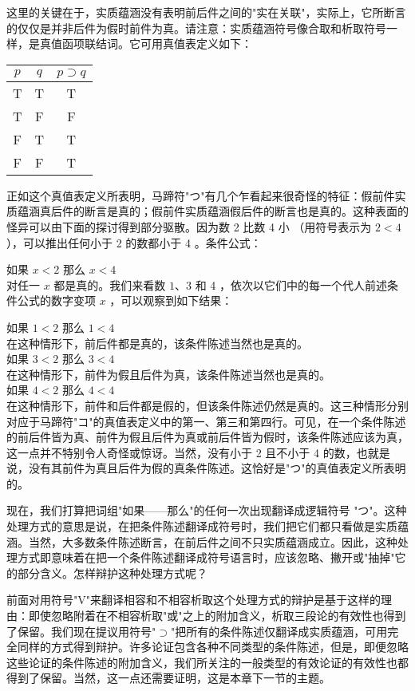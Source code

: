 这里的关键在于，实质蕴涵没有表明前后件之间的"实在关联"，实际上，它所断言的仅仅是并非后件为假时前件为真。请注意：实质蕴涵符号像合取和析取符号一样，是真值函项联结词。它可用真值表定义如下：

\begin{center}
\begin{tabular}{|ccc|}
\hline
$p$ & $q$ & $p \supset q$ \\
\hline
T & T & T \\
T & F & F \\
F & T & T \\
F & F & T \\
\hline
\end{tabular}
\end{center}

正如这个真值表定义所表明，马蹄符"つ"有几个乍看起来很奇怪的特征：假前件实质蕴涵真后件的断言是真的；假前件实质蕴涵假后件的断言也是真的。这种表面的怪异可以由下面的探讨得到部分驱散。因为数 2 比数 4 小 （用符号表示为 $2<4$ ），可以推出任何小于 2 的数都小于 4 。条件公式：

如果 $x<2$ 那么 $x<4$\\
对任一 $x$ 都是真的。我们来看数 $1 、 3$ 和 4 ，依次以它们中的每一个代人前述条件公式的数字变项 $x$ ，可以观察到如下结果：

如果 $1<2$ 那么 $1<4$\\
在这种情形下，前后件都是真的，该条件陈述当然也是真的。\\
如果 $3<2$ 那么 $3<4$\\
在这种情形下，前件为假且后件为真，该条件陈述当然也是真的。\\
如果 $4<2$ 那么 $4<4$\\
在这种情形下，前件和后件都是假的，但该条件陈述仍然是真的。这三种情形分别对应于马蹄符"コ"的真值表定义中的第一、第三和第四行。可见，在一个条件陈述的前后件皆为真、前件为假且后件为真或前后件皆为假时，该条件陈述应该为真，这一点并不特别令人奇怪或惊讶。当然，没有小于 2 且不小于 4 的数，也就是说，没有其前件为真且后件为假的真条件陈述。这恰好是"つ"的真值表定义所表明的。

现在，我们打算把词组"如果——那么"的任何一次出现翻译成逻辑符号 "つ"。这种处理方式的意思是说，在把条件陈述翻译成符号时，我们把它们都只看做是实质蕴涵。当然，大多数条件陈述断言，在前后件之间不只实质蕴涵成立。因此，这种处理方式即意味着在把一个条件陈述翻译成符号语言时，应该忽略、撇开或"抽掉"它的部分含义。怎样辩护这种处理方式呢？

前面对用符号"V"来翻译相容和不相容析取这个处理方式的辩护是基于这样的理由：即使忽略附着在不相容析取"或"之上的附加含义，析取三段论的有效性也得到了保留。我们现在提议用符号"$\supset$"把所有的条件陈述仅翻译成实质蕴涵，可用完全同样的方式得到辩护。许多论证包含各种不同类型的条件陈述，但是，即便忽略这些论证的条件陈述的附加含义，我们所关注的一般类型的有效论证的有效性也都得到了保留。当然，这一点还需要证明，这是本章下一节的主题。

